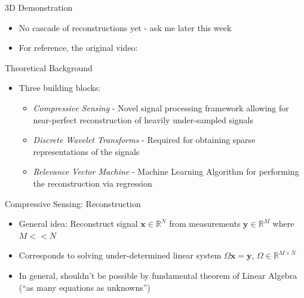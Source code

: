 \documentclass[xcolor=table]{beamer}
\numberwithin{equation}{section}
\let\bs\boldsymbol
\begin{document}
\begin{frame}{3D Demonstration}
\begin{itemize}
\item No cascade of reconstructions yet - ask me later this week
\item For reference, the original video:
\end{itemize}
\hspace{1in}
\end{frame}

\begin{frame}{Theoretical Background}
\begin{itemize} %
\item Three building blocks:
\begin{itemize}
\item \emph{Compressive Sensing} - Novel signal processing framework allowing for near-perfect reconstruction of heavily under-sampled signals
\item \emph{Discrete Wavelet Transforms} - Required for obtaining sparse representations of the signals
\item \emph{Relevance Vector Machine} - Machine Learning Algorithm for performing the reconstruction via regression
\end{itemize}
\end{itemize}
\end{frame}

\begin{frame}{Compressive Sensing: Reconstruction}
\begin{itemize}%
\item General idea: Reconstruct signal $\bs x\in\mathbb{R}^N$ from measurements $\bs y\in\mathbb{R}^M$ where $M<<N$
\item Corresponds to solving under-determined linear system $\Omega \bs x = \bs y$, $\Omega \in \mathbb{R}^{M\times N}$
\item In general, shouldn't be possible by fundamental theorem of Linear Algebra (``as many equations as unknowns'')
\end{itemize}
\end{frame}
\end{document}
